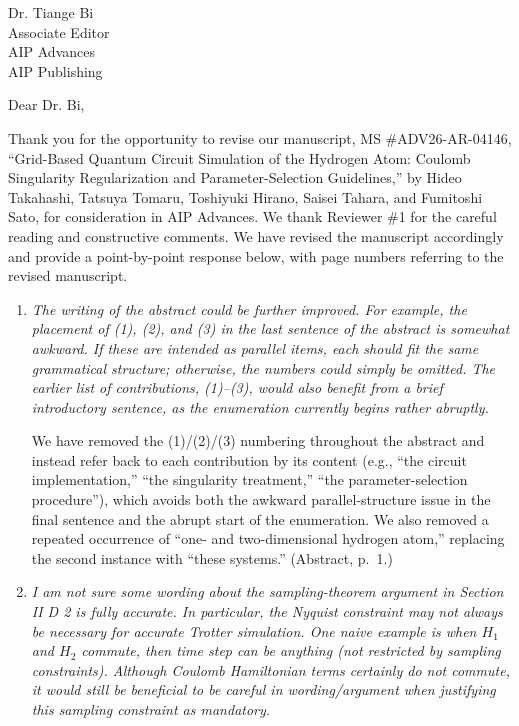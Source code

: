 \documentclass[11pt]{letter}
\begin{document}
\begin{letter}{Dr. Tiange Bi \\ Associate Editor \\ AIP Advances \\ AIP Publishing}

\opening{Dear Dr. Bi,}

Thank you for the opportunity to revise our manuscript, MS \#ADV26-AR-04146,
``Grid-Based Quantum Circuit Simulation of the Hydrogen Atom: Coulomb
Singularity Regularization and Parameter-Selection Guidelines,'' by Hideo
Takahashi, Tatsuya Tomaru, Toshiyuki Hirano, Saisei Tahara, and Fumitoshi Sato,
for consideration in AIP Advances. We thank Reviewer \#1 for the careful
reading and constructive comments. We have revised the manuscript accordingly
and provide a point-by-point response below, with page numbers referring to
the revised manuscript.

\begin{enumerate}

\item \textit{The writing of the abstract could be further improved. For
example, the placement of (1), (2), and (3) in the last sentence of the
abstract is somewhat awkward. If these are intended as parallel items, each
should fit the same grammatical structure; otherwise, the numbers could simply
be omitted. The earlier list of contributions, (1)--(3), would also benefit
from a brief introductory sentence, as the enumeration currently begins rather
abruptly.}

We have removed the (1)/(2)/(3) numbering throughout the abstract and instead
refer back to each contribution by its content (e.g., ``the circuit
implementation,'' ``the singularity treatment,'' ``the parameter-selection
procedure''), which avoids both the awkward parallel-structure issue in the
final sentence and the abrupt start of the enumeration. We also removed a
repeated occurrence of ``one- and two-dimensional hydrogen atom,'' replacing
the second instance with ``these systems.'' (Abstract, p.~1.)

\item \textit{I am not sure some wording about the sampling-theorem argument
in Section II D 2 is fully accurate. In particular, the Nyquist constraint may
not always be necessary for accurate Trotter simulation. One naive example is
when $H_1$ and $H_2$ commute, then time step can be anything (not restricted
by sampling constraints). Although Coulomb Hamiltonian terms certainly do not
commute, it would still be beneficial to be careful in wording/argument when
justifying this sampling constraint as mandatory.}


\end{enumerate}
\end{letter}
\end{document}

